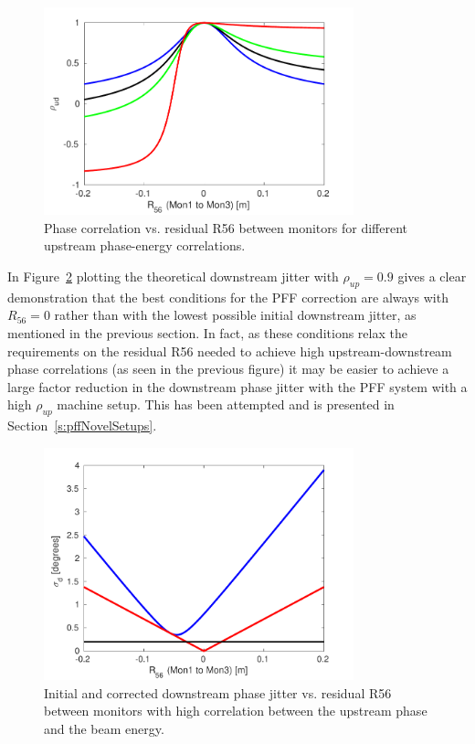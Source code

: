 \begin{figure}
  \centering
  \includegraphics[width=0.8\textwidth]{Figures/propagation/corrVsR56_CTENCorr}
  \caption{Phase correlation vs. residual R56 between monitors for different upstream phase-energy correlations.}
  \label{f:corrVsR56_CTENCorr}
\end{figure}

In Figure~\ref{f:jitVsR56_90ctencorr} plotting the theoretical downstream jitter with \(\rho_{up} = 0.9\) gives a clear demonstration that the best conditions for the PFF correction are always with \(R_{56} = 0\) rather than with the lowest possible initial downstream jitter, as mentioned in the previous section. In fact, as these conditions relax the requirements on the residual R56 needed to achieve high upstream-downstream phase correlations (as seen in the previous figure) it may be easier to achieve a large factor reduction in the downstream phase jitter with the PFF system with a high \(\rho_{up}\) machine setup. This has been attempted and is presented in Section~\ref{s:pffNovelSetups}.

\begin{figure}
  \centering
  \includegraphics[width=0.8\textwidth]{Figures/propagation/jitVsR56_90ctencorr}
  \caption{Initial and corrected downstream phase jitter vs. residual R56 between monitors with high correlation between the upstream phase and the beam energy.}
  \label{f:jitVsR56_90ctencorr}
\end{figure}

